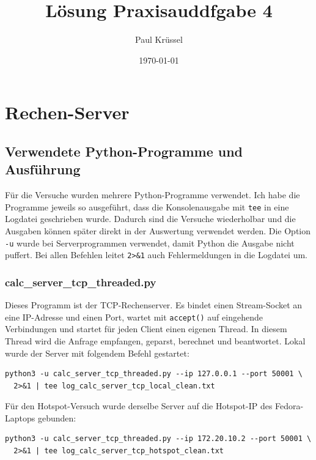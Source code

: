 \documentclass{kdiartcl}
\institute{Fachbereich Angewandte Informatik}
\date{\today}
\author{Paul Krüssel}
\title{Lösung Praxisauddfgabe 4}
\begin{document}
\maketitle

\setcounter{section}{2}

\section{Rechen-Server}

\subsection*{Verwendete Python-Programme und Ausführung}

Für die Versuche wurden mehrere Python-Programme verwendet. Ich habe die Programme jeweils so ausgeführt, dass die Konsolenausgabe mit \texttt{tee} in eine Logdatei geschrieben wurde. Dadurch sind die Versuche wiederholbar und die Ausgaben können später direkt in der Auswertung verwendet werden. Die Option \texttt{-u} wurde bei Serverprogrammen verwendet, damit Python die Ausgabe nicht puffert. Bei allen Befehlen leitet \texttt{2>\&1} auch Fehlermeldungen in die Logdatei um.

\subsubsection*{calc\_server\_tcp\_threaded.py}

Dieses Programm ist der TCP-Rechenserver. Es bindet einen Stream-Socket an eine IP-Adresse und einen Port, wartet mit \texttt{accept()} auf eingehende Verbindungen und startet für jeden Client einen eigenen Thread. In diesem Thread wird die Anfrage empfangen, geparst, berechnet und beantwortet. Lokal wurde der Server mit folgendem Befehl gestartet:

\begin{verbatim}
python3 -u calc_server_tcp_threaded.py --ip 127.0.0.1 --port 50001 \
  2>&1 | tee log_calc_server_tcp_local_clean.txt
\end{verbatim}

Für den Hotspot-Versuch wurde derselbe Server auf die Hotspot-IP des Fedora-Laptops gebunden:

\begin{verbatim}
python3 -u calc_server_tcp_threaded.py --ip 172.20.10.2 --port 50001 \
  2>&1 | tee log_calc_server_tcp_hotspot_clean.txt
\end{verbatim}
\end{document}
